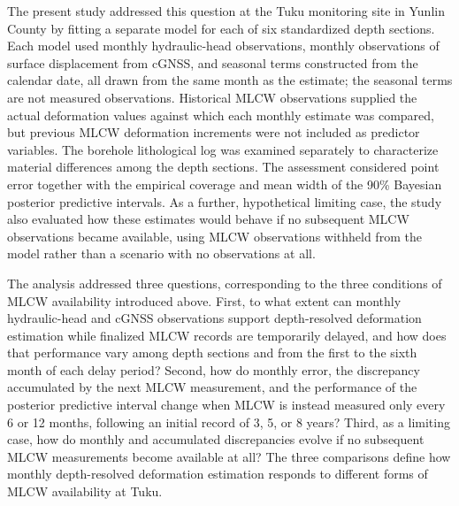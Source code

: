 The present study addressed this question at the Tuku monitoring site in Yunlin County by fitting a separate model for each of six standardized depth sections. Each model used monthly hydraulic-head observations, monthly observations of surface displacement from cGNSS, and seasonal terms constructed from the calendar date, all drawn from the same month as the estimate; the seasonal terms are not measured observations. Historical MLCW observations supplied the actual deformation values against which each monthly estimate was compared, but previous MLCW deformation increments were not included as predictor variables. The borehole lithological log was examined separately to characterize material differences among the depth sections. The assessment considered point error together with the empirical coverage and mean width of the 90\% Bayesian posterior predictive intervals. As a further, hypothetical limiting case, the study also evaluated how these estimates would behave if no subsequent MLCW observations became available, using MLCW observations withheld from the model rather than a scenario with no observations at all.

The analysis addressed three questions, corresponding to the three conditions of MLCW availability introduced above. First, to what extent can monthly hydraulic-head and cGNSS observations support depth-resolved deformation estimation while finalized MLCW records are temporarily delayed, and how does that performance vary among depth sections and from the first to the sixth month of each delay period? Second, how do monthly error, the discrepancy accumulated by the next MLCW measurement, and the performance of the posterior predictive interval change when MLCW is instead measured only every 6 or 12 months, following an initial record of 3, 5, or 8 years? Third, as a limiting case, how do monthly and accumulated discrepancies evolve if no subsequent MLCW measurements become available at all? The three comparisons define how monthly depth-resolved deformation estimation responds to different forms of MLCW availability at Tuku.
